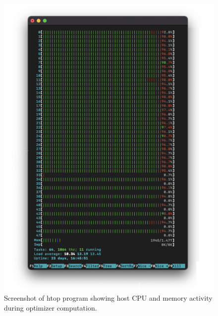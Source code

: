 \begin{figure}[htbp]
    \centering
    \includegraphics[width=\textwidth]{figures/htop-optimizer-computation.png}
    \caption{Screenshot of htop program showing host CPU and memory activity during optimizer computation.}
    \label{fig:htop-optimizer-computation}
\end{figure}


